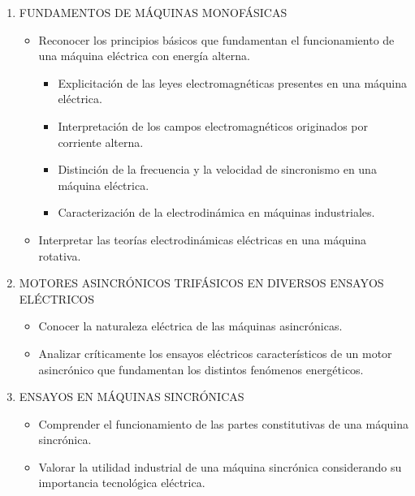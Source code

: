 \documentclass[../main]{subfiles}
\begin{document}
\begin{enumerate}
    \item FUNDAMENTOS DE MÁQUINAS MONOFÁSICAS
    \begin{itemize}
        \item Reconocer los principios básicos que fundamentan el funcionamiento de una máquina eléctrica con energía alterna.
        \begin{itemize}
            \item Explicitación de las leyes electromagnéticas presentes en
una máquina eléctrica.
            \item Interpretación de los campos electromagnéticos
originados por corriente alterna.
            \item Distinción de la frecuencia y la velocidad de sincronismo
en una máquina eléctrica.
            \item Caracterización de la electrodinámica en máquinas
industriales.
        \end{itemize}
        
        \item Interpretar las teorías electrodinámicas eléctricas en una máquina rotativa.
    \end{itemize}
    \item MOTORES ASINCRÓNICOS TRIFÁSICOS EN DIVERSOS ENSAYOS ELÉCTRICOS
    \begin{itemize}
        \item Conocer la naturaleza
eléctrica de las máquinas
asincrónicas.
        \item Analizar críticamente los
ensayos eléctricos
característicos de un motor
asincrónico que
fundamentan los distintos
fenómenos energéticos.
    
    \end{itemize}
    \item ENSAYOS EN MÁQUINAS SINCRÓNICAS
    \begin{itemize}
        \item Comprender el
funcionamiento de las
partes constitutivas de una
máquina sincrónica.
        \item Valorar la utilidad industrial
de una máquina sincrónica
considerando su
importancia tecnológica
eléctrica.
    \end{itemize}
\end{enumerate}

\newpage
\end{document}

